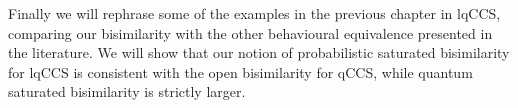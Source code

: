 Finally we will rephrase some of the examples in  the previous chapter in lqCCS, comparing our bisimilarity with the other behavioural equivalence presented in the literature. We will show that our notion of probabilistic saturated bisimilarity for lqCCS is consistent with the open bisimilarity  \cite{dengOpenBisimulationQuantum2012} for qCCS, while quantum saturated bisimilarity is strictly larger.